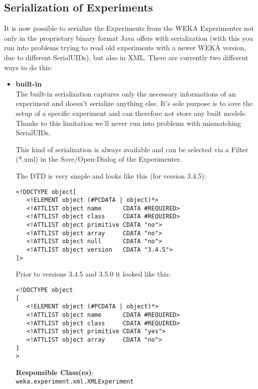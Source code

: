\newpage
\subsection{Serialization of Experiments}
It is now possible to serialize the Experiments from the WEKA
Experimenter not only in the proprietary binary format Java offers
with serialization (with this you run into problems trying to read old
experiments with a newer WEKA version, due to different SerialUIDs),
but also in XML. There are currently two different ways to do this:

\begin{itemize}
\item \textbf{built-in}\\
The built-in serialization captures only the necessary informations of
an experiment and doesn't serialize anything else. It's sole purpose
is to save the setup of a specific experiment and can therefore not
store any built models. Thanks to this limitation we'll never run into
problems with mismatching SerialUIDs.

This kind of serialization is always available and can be selected via
a Filter (*.xml) in the Save/Open-Dialog of the Experimenter.

The DTD is very simple and looks like this (for version 3.4.5): 

\begin{verbatim}
<!DOCTYPE object[
   <!ELEMENT object (#PCDATA | object)*>
   <!ATTLIST object name      CDATA #REQUIRED>
   <!ATTLIST object class     CDATA #REQUIRED>
   <!ATTLIST object primitive CDATA "no">
   <!ATTLIST object array     CDATA "no">   
   <!ATTLIST object null      CDATA "no">   
   <!ATTLIST object version   CDATA "3.4.5">
]>
\end{verbatim}

\noindent Prior to versions 3.4.5 and 3.5.0 it looked like this: 

\begin{verbatim}
<!DOCTYPE object
[
   <!ELEMENT object (#PCDATA | object)*>
   <!ATTLIST object name      CDATA #REQUIRED>
   <!ATTLIST object class     CDATA #REQUIRED>
   <!ATTLIST object primitive CDATA "yes">
   <!ATTLIST object array     CDATA "no">
]
>
\end{verbatim}

\noindent \textbf{Responsible Class(es)}:\\

\verb=weka.experiment.xml.XMLExperiment=\\


\end{itemize}
